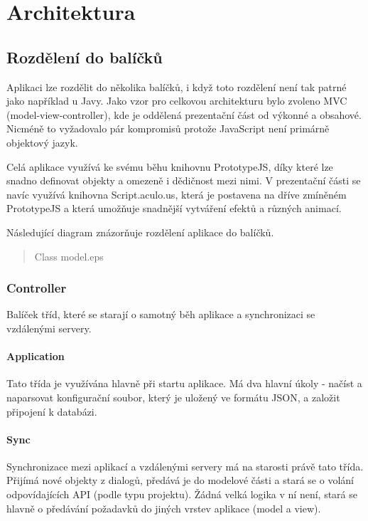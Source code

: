 \chapter{Architektura}

\section{Rozdělení do balíčků}

Aplikaci lze rozdělit do několika balíčků, i když toto rozdělení není tak patrné jako například u Javy. Jako vzor pro celkovou architekturu bylo zvoleno MVC (model-view-controller), kde je oddělená prezentační část od výkonné a obsahové. Nicméně to vyžadovalo pár kompromisů protože JavaScript není primárně objektový jazyk.

Celá aplikace využívá ke svému běhu knihovnu PrototypeJS, díky které lze snadno definovat objekty a omezeně i dědičnost mezi nimi. V prezentační části se navíc využívá knihovna Script.aculo.us, která je postavena na dříve zmíněném PrototypeJS a která umožňuje snadnější vytváření efektů a různých animací.

Následující diagram znázorňuje rozdělení aplikace do balíčků.

\begin{quote}
Class model.eps
\end{quote}

\subsection{Controller}

Balíček tříd, které se starají o samotný běh aplikace a synchronizaci se vzdálenými servery.

\subsubsection{Application}

Tato třída je využívána hlavně při startu aplikace. Má dva hlavní úkoly - načíst a naparsovat konfigurační soubor, který je uložený ve formátu JSON, a založit připojení k databázi.

\subsubsection{Sync}

Synchronizace mezi aplikací a vzdálenými servery má na starosti právě tato třída. Přijímá nové objekty z dialogů, předává je do modelové části a stará se o volání odpovídajících API (podle typu projektu). Žádná velká logika v ní není, stará se hlavně o předávání požadavků do jiných vrstev aplikace (model a view).

